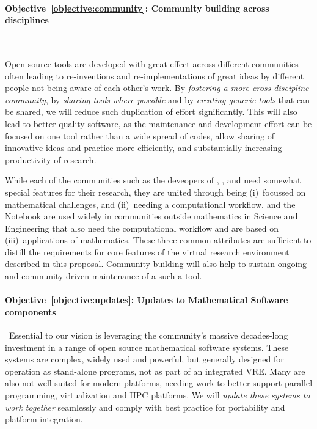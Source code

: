 \documentclass[noworkareas,deliverables,\classoptions]{euproposal}       %
\begin{document}
\begin{proposal}
\paragraph{Objective~\ref{objective:community}: Community building across disciplines}\ 


Open source tools are developed with great effect across different
communities often leading to re-inventions and re-implementations of
great ideas by different people not being aware of each other's work. By
\emph{fostering a more cross-discipline community}, by \emph{sharing tools where
possible} and by \emph{creating generic tools} that can be shared,
we will reduce such duplication of effort significantly. This will
also lead to better quality software, as the maintenance and
development effort can be focused on one tool rather than a wide
spread of codes, allow sharing of innovative ideas and practice more
efficiently, and substantially increasing productivity of research.

While each of the communities such as the deveopers of \Sage, \Singular, and \GAP need
somewhat special features for their research, they are united through
being (i)~focussed on mathematical challenges, and (ii)~needing a
computational workflow. \IPython and the \Jupyter Notebook are used
widely in communities outside mathematics in Science and Engineering
that also need the computational workflow and are based on
(iii)~applications of mathematics. These three common attributes are
sufficient to distill the requirements for core features of the
virtual research environment described in this
proposal. Community building will also help to sustain ongoing and
community driven maintenance of a such a tool.



\paragraph{Objective~\ref{objective:updates}: Updates to Mathematical
  Software components}\
Essential to our vision is leveraging the community's massive
decades-long investment in a range of open source mathematical
software systems. These systems are complex, widely used and powerful,
but generally designed for operation as stand-alone programs, not as
part of an integrated VRE. Many are also not well-suited for modern
platforms, needing work to better support parallel programming,
virtualization and HPC platforms. We will \emph{update these systems to work
together} seamlessly and comply with best practice for portability and
platform integration.



\end{proposal}
\end{document}
